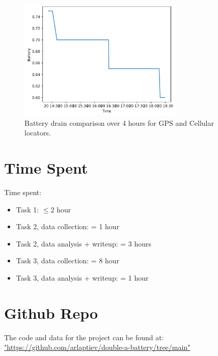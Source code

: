 \documentclass{lab}
\begin{document}
\begin{figure}[h!]
    \centering
    \includegraphics[width=0.7\textwidth]{images/battery_over_time_cellular.png}
    \caption{Battery drain comparison over 4 hours for GPS and Cellular locators.}
    \label{fig:battery_drain_xellular}
\end{figure}

\section{Time Spent} 

Time spent:

\begin{itemize}
  \item Task 1: $\leq 2$ hour
  \item Task 2, data collection: = 1 hour
  \item Task 2, data analysis + writeup: = 3 hours
  \item Task 3, data collection: =  8 hour
  \item Task 3, data analysis + writeup: = 1 hour
\end{itemize}

\section{Github Repo}

The code and data for the project can be found at: \url{"https://github.com/arlaptiev/double-a-battery/tree/main"}
\end{document}
